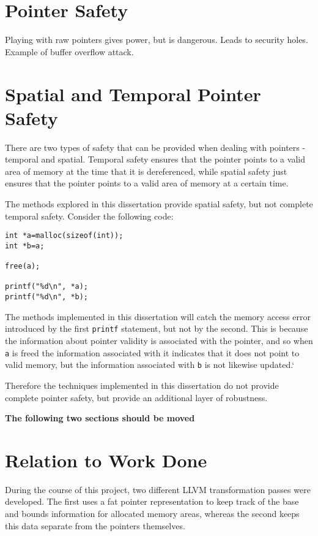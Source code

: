 \section{Pointer Safety}

Playing with raw pointers gives power, but is dangerous. Leads to security holes. Example of buffer overflow attack.

\section{Spatial and Temporal Pointer Safety}

There are two types of safety that can be provided when dealing with pointers - temporal and spatial.
Temporal safety ensures that the pointer points to a valid area of memory at the time that it is dereferenced, while spatial safety just ensures that the pointer points to a valid area of memory at a certain time.

The methods explored in this dissertation provide spatial safety, but not complete temporal safety.
Consider the following code:

\begin{verbatim}
int *a=malloc(sizeof(int));
int *b=a;

free(a);

printf("%d\n", *a);
printf("%d\n", *b);
\end{verbatim}

The methods implemented in this dissertation will catch the memory access error introduced by the first \verb!printf! statement, but not by the second.
This is because the information about pointer validity is associated with the pointer, and so when \verb!a! is freed the information associated with it indicates that it does not point to valid memory, but the information associated with \verb!b! is not likewise updated.`

Therefore the techniques implemented in this dissertation do not provide complete pointer safety, but provide an additional layer of robustness.


\textbf{The following two sections should be moved}


\section{Relation to Work Done}

During the course of this project, two different LLVM transformation passes were developed.
The first uses a fat pointer representation to keep track of the base and bounds information for allocated memory areas, whereas the second keeps this data separate from the pointers themselves.

